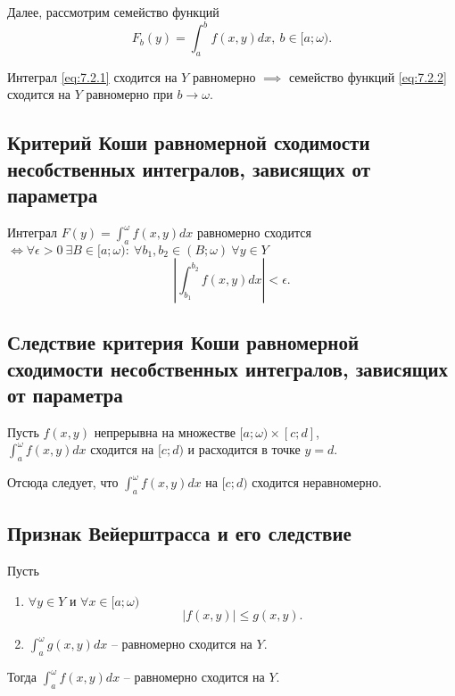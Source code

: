 \begin{note}
    Далее, рассмотрим семейство функций
    \begin{equation}\label{eq:7.2.2}
        F_b(y) = \int_{a}^{b}f(x,y)dx, \ b \in [a;\omega).
    \end{equation}
\end{note}

\begin{statement}
    Интеграл \ref{eq:7.2.1} сходится на $ Y $ равномерно $ \implies $ семейство функций \ref{eq:7.2.2} сходится на $ Y $ равномерно при $ b \rightarrow \omega $.
\end{statement}

\subsection{Критерий Коши равномерной сходимости несобственных интегралов, зависящих от параметра}

\begin{theorem}
    Интеграл $F(y) = \int_{a}^{\omega}f(x,y)dx$ равномерно сходится $\iff \forall \epsilon > 0 \ \exists B \in [a;\omega): \ \forall b_1,b_2 \in (B;\omega) \ \forall y \in Y$
    \[
        \left|\int_{b_1}^{b_2}f(x,y)dx\right| < \epsilon.
    \]
\end{theorem}

\subsection{Следствие критерия Коши равномерной сходимости несобственных интегралов, зависящих от параметра}

\begin{corollary}
    Пусть $f(x,y)$ непрерывна на множестве $[a;\omega)\times[c;d] $, \\ $\int_{a}^{\omega}f(x,y)dx$ сходится на $[c;d)$ и расходится в точке $y = d$.

    Отсюда следует, что $\int_{a}^{\omega}f(x,y)dx$ на $[c;d)$ сходится неравномерно.
\end{corollary}

\subsection{Признак Вейерштрасса и его следствие}

\begin{theorem}
    Пусть \begin{enumerate}
        \item $\forall y \in Y$ и $\forall x \in [a;\omega)$
              \[
                  \big|f(x,y)\big| \leqslant g(x,y).
              \]
        \item $\int_{a}^{\omega}g(x,y)dx$ -- равномерно сходится на $Y$.
    \end{enumerate}

    Тогда $\int_{a}^{\omega}f(x,y)dx$ -- равномерно сходится на $Y$.
\end{theorem}

